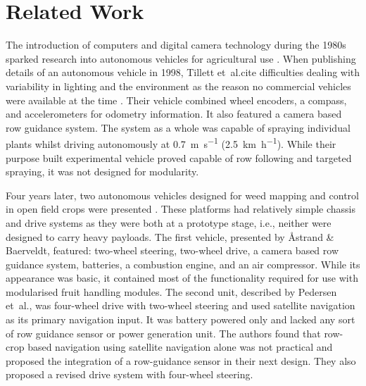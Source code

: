 \documentclass[preprint,authoryear,12pt]{elsarticle}
\begin{document}
\section{Related Work}
\label{sect:review}

        The introduction of computers and digital camera technology during the 1980s sparked research into autonomous vehicles for agricultural use \citep{Li2009}.
        When publishing details of an autonomous vehicle in 1998, Tillett et~al.\@ cite difficulties dealing with variability in lighting and the environment as the reason no commercial vehicles were available at the time \citep{Tillett1998}.
        Their vehicle combined wheel encoders, a compass, and accelerometers for odometry information.
        It also featured a camera based row guidance system.
        The system as a whole was capable of spraying individual plants whilst driving autonomously at \SI{0.7}{\meter\per\second} (\SI{2.5}{\kilo\meter\per\hour}).
        While their purpose built experimental vehicle proved capable of row following and targeted spraying, it was not designed for modularity.


        Four years later, two autonomous vehicles designed for weed mapping and control in open field crops were presented \citep{Pedersen2002,Astrand2002}.
        These platforms had relatively simple chassis and drive systems as they were both at a prototype stage, i.e., neither were designed to carry heavy payloads.
        The first vehicle, presented by Åstrand \& Baerveldt, featured: two-wheel steering, two-wheel drive, a camera based row guidance system, batteries, a combustion engine, and an air compressor.
        While its appearance was basic, it contained most of the functionality required for use with modularised fruit handling modules.
        The second unit, described by Pedersen et~al.\@, was four-wheel drive with two-wheel steering and used satellite navigation as its primary navigation input.
        It was battery powered only and lacked any sort of row guidance sensor or power generation unit.
        The authors found that row-crop based navigation using satellite navigation alone was not practical and proposed the integration of a row-guidance sensor in their next design.
        They also proposed a revised drive system with four-wheel steering.%
\end{document}
